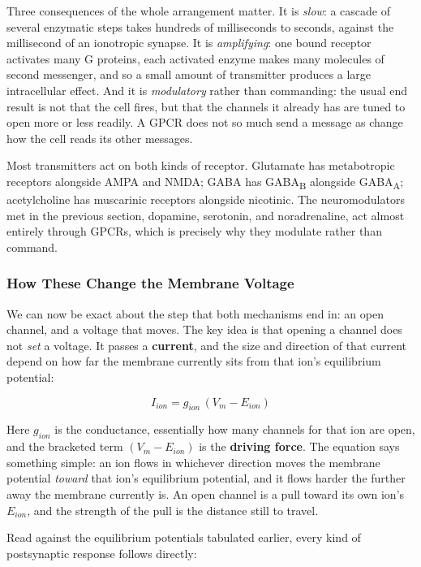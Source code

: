 \documentclass[11pt]{article}
\begin{document}
Three consequences of the whole arrangement matter. It is \textit{slow}: a cascade of several enzymatic steps takes hundreds of milliseconds to seconds, against the millisecond of an ionotropic synapse. It is \textit{amplifying}: one bound receptor activates many G proteins, each activated enzyme makes many molecules of second messenger, and so a small amount of transmitter produces a large intracellular effect. And it is \textit{modulatory} rather than commanding: the usual end result is not that the cell fires, but that the channels it already has are tuned to open more or less readily. A GPCR does not so much send a message as change how the cell reads its other messages.

Most transmitters act on both kinds of receptor. Glutamate has metabotropic receptors alongside AMPA and NMDA; GABA has GABA\textsubscript{B} alongside GABA\textsubscript{A}; acetylcholine has muscarinic receptors alongside nicotinic. The neuromodulators met in the previous section, dopamine, serotonin, and noradrenaline, act almost entirely through GPCRs, which is precisely why they modulate rather than command.

\subsubsection{How These Change the Membrane Voltage}

We can now be exact about the step that both mechanisms end in: an open channel, and a voltage that moves. The key idea is that opening a channel does not \textit{set} a voltage. It passes a \textbf{current}, and the size and direction of that current depend on how far the membrane currently sits from that ion's equilibrium potential:

\[
I_{ion} = g_{ion}\,(V_m - E_{ion})
\]

Here $g_{ion}$ is the conductance, essentially how many channels for that ion are open, and the bracketed term $(V_m - E_{ion})$ is the \textbf{driving force}. The equation says something simple: an ion flows in whichever direction moves the membrane potential \textit{toward} that ion's equilibrium potential, and it flows harder the further away the membrane currently is. An open channel is a pull toward its own ion's $E_{ion}$, and the strength of the pull is the distance still to travel.

Read against the equilibrium potentials tabulated earlier, every kind of postsynaptic response follows directly:
\end{document}
